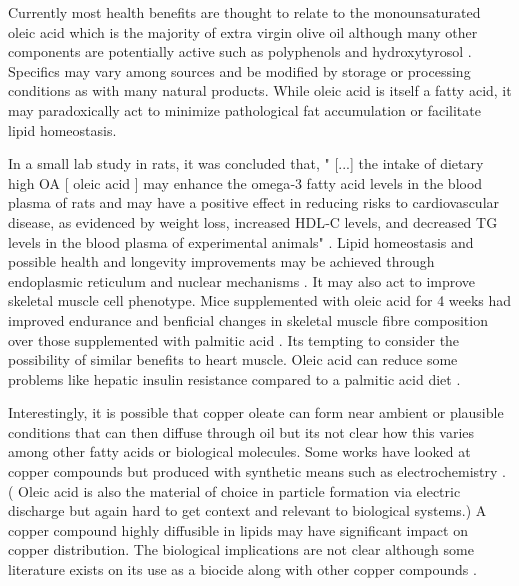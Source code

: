 
Currently most health benefits are thought to relate to
the monounsaturated oleic acid which is the majority 
of extra virgin olive oil although many other components
are potentially active such as polyphenols and
hydroxytyrosol  \cite{LU2024529}
\cite{Milena_Maurizio_Exploring_Cardiovascular_Benefits_2025}
.
Specifics may vary among sources and be modified by
storage or processing conditions 
\cite{Allouche_Jimenez_Gaforio_Heating_Affects_Extra_2007}
as with many natural products.
While oleic acid is itself a fatty acid, it may paradoxically  
act to minimize
pathological fat accumulation or facilitate lipid homeostasis.


In a small lab study in rats, it was concluded that, 
" [...]  the intake of dietary high OA [ oleic acid ]  may enhance 
the omega‐3 fatty acid levels in the blood plasma of rats and 
may have a positive effect in reducing risks to cardiovascular disease, 
as evidenced by weight loss, increased HDL‐C levels, and decreased 
TG levels in the blood plasma of experimental animals" \cite{PMC7382191}.
Lipid homeostasis and  possible health and longevity improvements may be
achieved through endoplasmic reticulum and nuclear mechanisms
\cite{CastilloQuan_Steinbaugh_FernandezCardenas_antisteatosis_response_regulated_2023} 
.
It may also act to improve skeletal muscle cell phenotype.
Mice supplemented with oleic acid for 4 weeks had improved endurance
and benficial changes in skeletal muscle fibre composition 
over those supplemented with palmitic acid 
\cite{Komiya_Iseki_Ochiai_Dietary_oleic_acid_intake_2024}.
Its tempting to consider the possibility of similar benefits
to heart muscle. 
Oleic acid can reduce some problems like hepatic insulin resistance
compared to  a palmitic acid diet \cite{10.1016/j.gpb.2019.06.005}.


Interestingly, it is possible that copper oleate can form
near ambient or plausible conditions
that can then diffuse through oil 
\cite{Liang_Wang_Zhong_Investigation_Into_Formation_2024}
but its not clear how this varies among other fatty acids or biological
molecules. Some works have looked at copper compounds but produced
with synthetic means such as electrochemistry
\cite{CostaCarvalho_Copper_Organic_Complexes_Synthetized_2022}.
( Oleic acid is also the material of choice in particle formation
via electric discharge \cite{Khilji_BintiMohdSafee_Pathak_Facile_Manufacture_Oxide_2022} but again hard to get context and relevant to biological systems.)
A copper compound highly diffusible in lipids may have significant impact
on copper distribution.  The biological implications are not clear
although some literature exists on its use as a biocide
along with other copper compounds
\cite{Sharma_Sharma_Saxena_Biomedical_antifungal_application_2018}.


